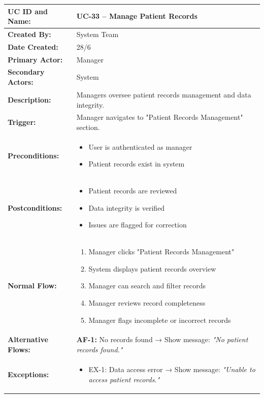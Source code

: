 \documentclass[12pt,a4paper]{article}
\begin{document}
\renewcommand{\arraystretch}{1.5}
\begin{longtable}{|p{4.5cm}|p{10.5cm}|}
\hline
\textbf{UC ID and Name:} & UC-33 – Manage Patient Records \\
\hline
\textbf{Created By:} & System Team \\
\hline
\textbf{Date Created:} & 28/6 \\
\hline
\textbf{Primary Actor:} & Manager \\
\hline
\textbf{Secondary Actors:} & System \\
\hline
\textbf{Description:} & Managers oversee patient records management and data integrity. \\
\hline
\textbf{Trigger:} & Manager navigates to "Patient Records Management" section. \\
\hline
\textbf{Preconditions:} &
\begin{itemize}
  \item User is authenticated as manager
  \item Patient records exist in system
\end{itemize} \\
\hline
\textbf{Postconditions:} &
\begin{itemize}
  \item Patient records are reviewed
  \item Data integrity is verified
  \item Issues are flagged for correction
\end{itemize} \\
\hline
\textbf{Normal Flow:} &
\begin{enumerate}
  \item Manager clicks "Patient Records Management"
  \item System displays patient records overview
  \item Manager can search and filter records
  \item Manager reviews record completeness
  \item Manager flags incomplete or incorrect records
\end{enumerate} \\
\hline
\textbf{Alternative Flows:} &
\textbf{AF-1:} No records found → Show message: \textit{"No patient records found."} \\
\hline
\textbf{Exceptions:} &
\begin{itemize}
  \item EX-1: Data access error → Show message: \textit{"Unable to access patient records."}

\end{itemize}
\end{longtable}
\end{document}
